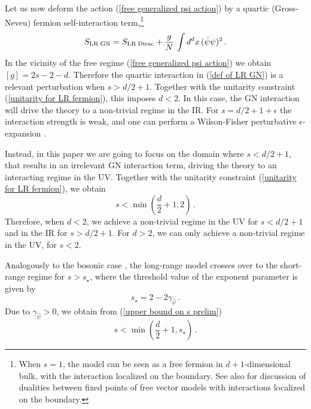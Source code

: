 \documentclass[aps,amsmath,amssymb,prd,showpacs,floatfix,preprint,superscriptaddress,nofootinbib,12pt]{article}
\begin{document}
Let us now deform the action (\ref{free generalized psi action}) by a quartic
(Gross-Neveu) fermion self-interaction term,\footnote{
When $s=1$, the model can be seen as a free fermion in $d+1$-dimensional bulk, with the interaction localized
on the boundary. See also \cite{DiPietro:2020fya} for discussion of dualities between fixed points
of free vector models with interactions localized on the boundary.}
\begin{equation}
\label{def of LR GN}
S_{\textrm{LR\;GN}} = S_{\textrm{LR\;Dirac}} + \frac{g}{N}\,
\int d^dx \,(\bar\psi\psi)^2\,.
\end{equation}
In the vicinity of the free regime (\ref{free generalized psi action})
we obtain $[g] = 2s-2-d$. Therefore the quartic interaction in (\ref{def of LR GN})
is a relevant perturbation when $s> d/2+1$. Together with the unitarity constraint
(\ref{unitarity for LR fermion}), this imposes $d < 2$. In this case, the GN interaction
will drive the theory to a non-trivial regime in the IR. For $s=d/2+1+\epsilon$
the interaction strength is weak, and
one can perform a Wilson-Fisher perturbative $\epsilon$-expansion \cite{Wilson:1971dc}.

Instead, in this
paper we are going to focus on the domain where $s < d/2 + 1$, that results
in an irrelevant GN interaction term, driving the theory to an interacting regime in the UV.
Together with the unitarity constraint (\ref{unitarity for LR fermion}), we obtain
\begin{equation}
\label{upper bound on s prelim}
s < \min\left(\frac{d}{2}+1,2\right)\,.
\end{equation}
Therefore, when $d< 2$, we achieve a non-trivial regime in the UV for $s < d/2+1$
and in the IR for $s > d/2+1$. For $d>2$, we can only achieve a non-trivial regime
in the UV, for $s<2$.

Analogously to the bosonic case  \cite{Sak:1973,Sak:1977}, the long-range
model crosses over to the short-range regime for 
$s>s_\star$, where the threshold value of the exponent parameter is given by
\begin{equation}
s_\star = 2 - 2\gamma_{\hat\psi}\,.
\end{equation}
Due to $\gamma_{\hat\psi} > 0$, we obtain from (\ref{upper bound on s prelim})
\begin{equation}
\label{upper bound on s}
s < \min\left(\frac{d}{2}+1,s_\star\right)\,.
\end{equation}
\end{document}
